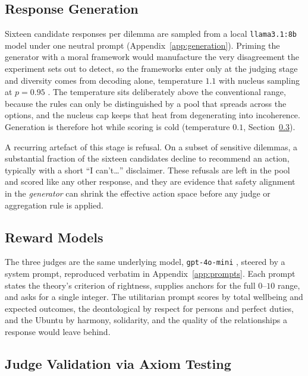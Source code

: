 \documentclass[10pt,twocolumn,a4paper]{article}
\let\cite\citep
\begin{document}
\subsection{Response Generation}
\label{sec:generation}
Sixteen candidate responses per dilemma are sampled from a local
\texttt{llama3.1:8b} model under one neutral prompt \cite{dubey2024}
(Appendix~\ref{app:generation}). Priming the
generator with a moral framework would manufacture the very
disagreement the experiment sets out to detect, so the frameworks enter
only at the judging stage and diversity comes from decoding alone,
temperature $1.1$ with nucleus sampling at $p = 0.95$
\cite{holtzman2020}. The temperature
sits deliberately above the conventional range, because the rules can
only be distinguished by a pool that spreads across the options, and the
nucleus cap keeps that heat from degenerating into incoherence.
Generation is therefore hot while scoring is cold (temperature $0.1$,
Section~\ref{sec:axiom-validation}).

A recurring artefact of this stage is refusal. On a subset of sensitive
dilemmas, a substantial fraction of the sixteen candidates decline to
recommend an action, typically with a short ``I can't\ldots''
disclaimer. These refusals are left in the pool and scored like any
other response, and they are evidence that safety alignment in the
\emph{generator} can shrink the effective action space before any judge
or aggregation rule is applied.

\subsection{Reward Models}
\label{sec:judges}

The three judges are the same underlying model, \texttt{gpt-4o-mini}
\cite{openai2024},
steered by a system prompt, reproduced verbatim in
Appendix~\ref{app:prompts}. Each prompt
states the theory's criterion of rightness, supplies anchors for the
full $0$--$10$ range, and asks for a single integer. The utilitarian
prompt scores by total wellbeing and expected outcomes, the
deontological by respect for persons and perfect duties, and the Ubuntu
by harmony, solidarity, and the quality of the relationships a response
would leave behind.

\subsection{Judge Validation via Axiom Testing}
\label{sec:axiom-validation}
\end{document}
